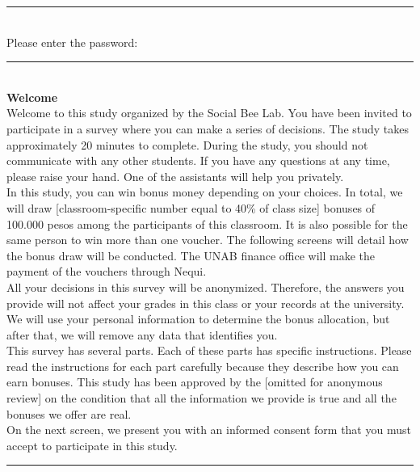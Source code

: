\documentclass[11pt,a4paper,oneside]{article}
\begin{document}
\noindent\rule{\textwidth}{0.4pt}\\

\noindent Please enter the password:


\noindent\rule{\textwidth}{0.4pt} \\

\noindent\textbf{Welcome}\\

\noindent Welcome to this study organized by the Social Bee Lab. You have been invited to participate in a survey where you can make a series of decisions. The study takes approximately 20 minutes to complete. During the study, you should not communicate with any other students. If you have any questions at any time, please raise your hand. One of the assistants will help you privately. \\

\noindent In this study, you can win bonus money depending on your choices. In total, we will draw [classroom-specific number equal to 40\% of class size] bonuses of 100.000 pesos among the participants of this classroom. It is also possible for the same person to win more than one voucher. The following screens will detail how the bonus draw will be conducted. The UNAB finance office will make the payment of the vouchers through Nequi.\\

\noindent All your decisions in this survey will be anonymized. Therefore, the answers you provide will not affect your grades in this class or your records at the university. We will use your personal information to determine the bonus allocation, but after that, we will remove any data that identifies you. \\

\noindent This survey has several parts. Each of these parts has specific instructions. Please read the instructions for each part carefully because they describe how you can earn bonuses. This study has been approved by the [omitted for anonymous review] on the condition that all the information we provide is true and all the bonuses we offer are real.\\
\noindent On the next screen, we present you with an informed consent form that you must accept to participate in this study.

\noindent\rule{\textwidth}{0.4pt}\\
\end{document}
